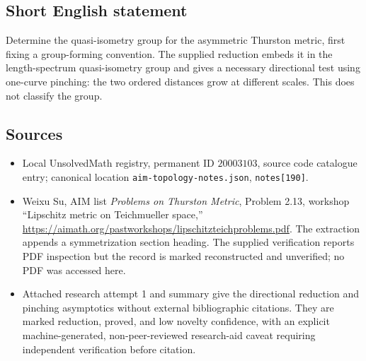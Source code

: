 \documentclass[11pt]{article}
\begin{document}
\subsection{Short English statement}
Determine the quasi-isometry group for the asymmetric Thurston metric, first fixing a group-forming convention. The supplied reduction embeds it in the length-spectrum quasi-isometry group and gives a necessary directional test using one-curve pinching: the two ordered distances grow at different scales. This does not classify the group.
\subsection{Sources}
\begin{itemize}
\item Local UnsolvedMath registry, permanent ID $20003103$, source code catalogue entry; canonical location \texttt{aim-topology-notes.json}, \texttt{notes[190]}.
\item Weixu Su, AIM list \emph{Problems on Thurston Metric}, Problem 2.13, workshop ``Lipschitz metric on Teichmueller space,'' \url{https://aimath.org/pastworkshops/lipschitzteichproblems.pdf}. The extraction appends a symmetrization section heading. The supplied verification reports PDF inspection but the record is marked reconstructed and unverified; no PDF was accessed here.
\item Attached research attempt 1 and summary give the directional reduction and pinching asymptotics without external bibliographic citations. They are marked reduction, proved, and low novelty confidence, with an explicit machine-generated, non-peer-reviewed research-aid caveat requiring independent verification before citation.
\end{itemize}
\end{document}
